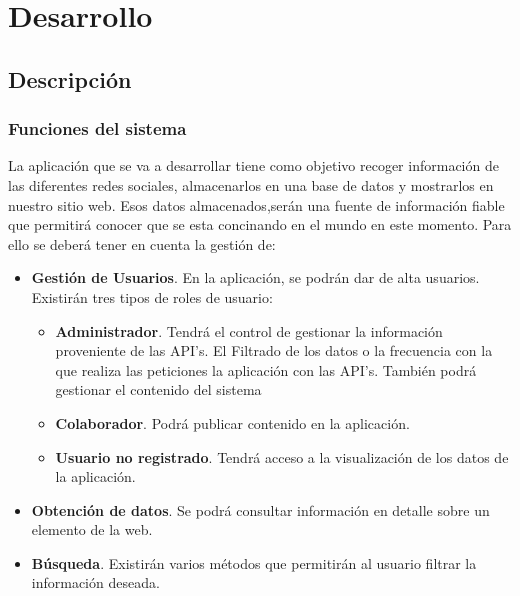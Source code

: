 
\chapter{Desarrollo}

\section{Descripción}

\subsection{Funciones del sistema}

La aplicación que se va a desarrollar tiene como objetivo recoger información de las diferentes redes sociales, almacenarlos en una base de datos y
mostrarlos en nuestro sitio web. Esos datos almacenados,serán una fuente de información fiable que permitirá conocer que se esta concinando en el mundo
en este momento. Para ello se deberá tener en cuenta la gestión de:

\begin{itemize}

\item \textbf{Gestión de Usuarios}. En la aplicación, se podrán dar de alta usuarios. Existirán tres tipos de roles de usuario:

\begin{itemize}
\item \textbf{Administrador}. Tendrá el control de gestionar la información proveniente de las API's. El Filtrado de los datos o la frecuencia con la que realiza las peticiones la aplicación con las API's.
También podrá gestionar el contenido del sistema
\item \textbf{Colaborador}. Podrá publicar contenido en la aplicación.
\item \textbf{Usuario no registrado}. Tendrá acceso a la visualización de los datos de la aplicación.
\end{itemize}

\item \textbf{Obtención de datos}. Se podrá consultar información en detalle sobre un elemento de la web.

\item \textbf{Búsqueda}. Existirán varios métodos que permitirán al usuario filtrar la información deseada.

\end{itemize}

